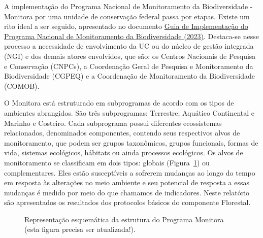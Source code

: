 \documentclass[
  letterpaper,
]{scrbook}
\begin{document}
A implementação do Programa Nacional de Monitoramento da Biodiversidade
- Monitora por uma unidade de conservação federal passa por etapas.
Existe um rito ideal a ser seguido, apresentado no documento
\href{https://www.gov.br/icmbio/pt-br/assuntos/monitoramento/conteudo/Materiais-de-Apoio/guiadeimplementaodomonitora16032023.pdf}{Guia
de Implementação do Programa Nacional de Monitoramento da Biodiversidade
(2023)}. Destaca-se nesse processo a necessidade de envolvimento da UC
ou do núcleo de gestão integrada (NGI) e dos demais atores envolvidos,
que são: os Centros Nacionais de Pesquisa e Conservação (CNPCs), a
Coordenação Geral de Pesquisa e Monitoramento da Biodiversidade (CGPEQ)
e a Coordenação de Monitoramento da Biodiversidade (COMOB).

O Monitora está estruturado em subprogramas de acordo com os tipos de
ambientes abrangidos. São três subprogramas: Terrestre, Aquático
Continental e Marinho e Costeiro. Cada subprograma possui diferentes
ecossistemas relacionados, denominados componentes, contendo seus
respectivos alvos de monitoramento, que podem ser grupos taxonômicos,
grupos funcionais, formas de vida, sistemas ecológicos, hábitats ou
ainda processos ecológicos. Os alvos de monitoramento se classificam em
dois tipos: globais (Figura~\ref{fig-alvos-globais}) ou complementares.
Eles estão susceptíveis a sofrerem mudanças ao longo do tempo em
resposta às alterações no meio ambiente e seu potencial de resposta a
essas mudanças é medido por meio do que chamamos de indicadores. Neste
relatório são apresentados os resultados dos protocolos básicos do
componente Florestal.

\begin{figure}[H]


\caption{\label{fig-alvos-globais}Representação esquemática da estrutura
do Programa Monitora (esta figura precisa ser atualizada!).}

\end{figure}%
\end{document}
